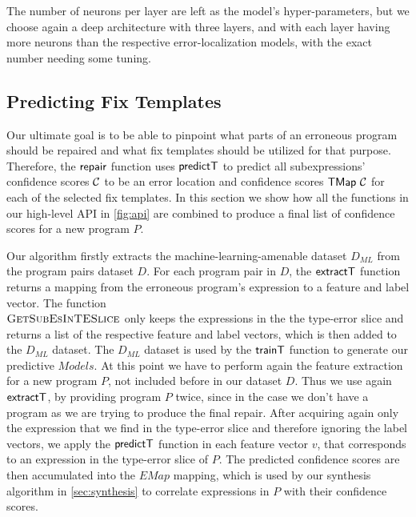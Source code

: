 The number of neurons per layer are left as the model's hyper-parameters, but we
choose again a deep architecture with three layers, and with each layer having
more neurons than the respective error-localization models, with the exact
number needing some tuning.



\subsection{Predicting Fix Templates}
\label{subsec:predict}

Our ultimate goal is to be able to pinpoint what parts of an erroneous program
should be repaired and what fix templates should be utilized for that purpose.
Therefore, the $\mathsf{repair}$ function uses $\mathsf{predictT}$ to predict all
subexpressions' confidence scores $\mathcal{C}$ to be an error location and
confidence scores $\mathsf{TMap}\ \mathcal{C}$ for each of the selected fix templates. In
this section we show how all the functions in our high-level API in
\autoref{fig:api} are combined to produce a final list of confidence scores for
a new program $P$.

Our algorithm firstly extracts the machine-learning-amenable dataset $D_{ML}$
from the program pairs dataset $D$. For each program pair in $D$, the
$\mathsf{extractT}$ function returns a mapping from the erroneous program's
expression to a feature and label vector. The function \\
$\textsc{GetSubEsInTESlice}$ only keeps the expressions in the the type-error
slice and returns a list of the respective feature and label vectors, which is
then added to the $D_{ML}$ dataset. The $D_{ML}$ dataset is used by the
$\mathsf{trainT}$ function to generate our predictive $Models$. At this point we have
to perform again the feature extraction for a new program $P$, not included
before in our dataset $D$. Thus we use again $\mathsf{extractT}$, by providing
program $P$ twice, since in the case we don't have a program as we are trying to
produce the final repair. After acquiring again only the expression that we find
in the type-error slice and therefore ignoring the label vectors, we apply the
$\mathsf{predictT}$ function in each feature vector $v$, that corresponds to an
expression in the type-error slice of $P$. The predicted confidence scores are
then accumulated into the $EMap$ mapping, which is used by our synthesis
algorithm in \autoref{sec:synthesis} to correlate expressions in $P$ with their
confidence scores.


